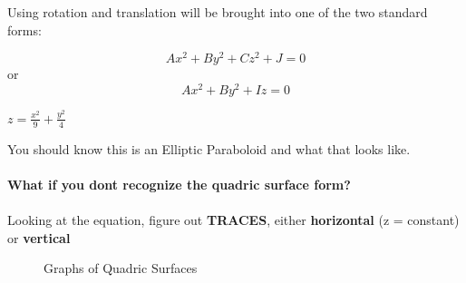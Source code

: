 Using rotation and translation will be brought into one of the two standard forms:

\begin{definition}
	\[Ax^2+By^2+Cz^2+J = 0\] or
	\[Ax^2+By^2+Iz=0\]
\end{definition}

\begin{example}
	$z = \frac{x^2}{9} + \frac{y^2}{4}$
\end{example}

\begin{solution}[]
	You should know this is an Elliptic Paraboloid and what that looks like.
\end{solution}

\paragraph{What if you dont recognize the quadric surface form?}

\paragraph{}
	Looking at the equation, figure out \textbf{TRACES}, either \textbf{horizontal} (z = constant) or \textbf{vertical}

\begin{figure}[ht]
    \centering
    \caption{Graphs of Quadric Surfaces}
    \label{fig:graphs-of-quadric-surfaces}
\end{figure}


















\newpage


